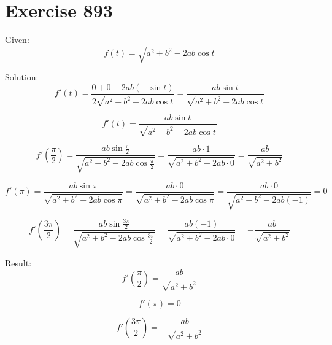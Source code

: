 \documentclass[a4paper, 10pt]{scrartcl}
\begin{document}
\section{Exercise 893}

Given:
\[
f(t) = \sqrt{a^{2} + b^{2} - 2ab\cos{t}}
\]

Solution:
\[
f'(t) = \frac{0 + 0 - 2ab(-\sin{t})}{2\sqrt{a^{2} + b^{2} - 2ab\cos{t}}} = \frac{ab\sin{t}}{\sqrt{a^{2} + b^{2} - 2ab\cos{t}}}
\]

\[
f'(t) = \frac{ab\sin{t}}{\sqrt{a^{2} + b^{2} - 2ab\cos{t}}}
\]

\[
f'(\frac{\pi}{2}) = \frac{ab\sin{\frac{\pi}{2}}}{\sqrt{a^{2} + b^{2} - 2ab\cos{\frac{\pi}{2}}}} =
\frac{ab\cdot1}{\sqrt{a^{2} + b^{2} - 2ab\cdot0}} = \frac{ab}{\sqrt{a^{2} + b^{2}}}
\]

\[
f'(\pi) = \frac{ab\sin{\pi}}{\sqrt{a^{2} + b^{2} - 2ab\cos{\pi}}} =
\frac{ab\cdot0}{\sqrt{a^{2} + b^{2} - 2ab\cos{\pi}}} = \frac{ab\cdot0}{\sqrt{a^{2} + b^{2} - 2ab(-1)}} = 0
\]

\[
f'(\frac{3\pi}{2}) = \frac{ab\sin{\frac{3\pi}{2}}}{\sqrt{a^{2} + b^{2} - 2ab\cos{\frac{3\pi}{2}}}} =
\frac{ab(-1)}{\sqrt{a^{2} + b^{2} - 2ab\cdot0}} = -\frac{ab}{\sqrt{a^{2} + b^{2}}}
\]

Result:
\[
f'(\frac{\pi}{2}) = \frac{ab}{\sqrt{a^{2} + b^{2}}}
\]

\[
f'(\pi) = 0
\]

\[
f'(\frac{3\pi}{2}) = -\frac{ab}{\sqrt{a^{2} + b^{2}}}
\]
\end{document}
